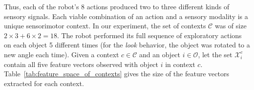 Thus, each of the robot's 8 actions produced two to three different kinds of sensory signals.
Each viable combination of an action and a sensory modality is a unique sensorimotor context.
In our experiment, the set of contexts $\mathcal{C}$ was of size  $2 \times 3 + 6 \times 2 = 18$.
The robot performed its full sequence of exploratory actions on each object 5 different times (for the {\it look} behavior, the object was rotated to a new angle each time). Given a context $c \in \mathcal{C}$ and an object $i \in \mathcal{O}$, let the set $\mathcal{X}_i^c$ contain all five feature vectors observed with object $i$ in context $c$.
Table~\ref{tab:feature_space_of_contexts} gives the size of the feature vectors extracted for each context.